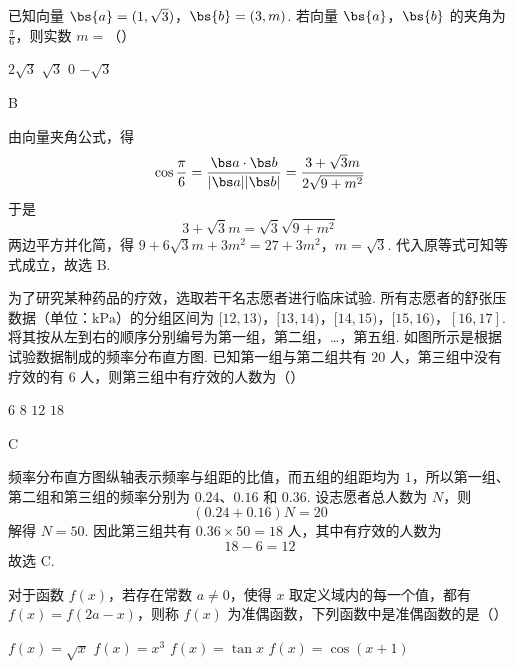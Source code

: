 \begin{problem}
已知向量 \(\bs{a} = (1, \sqrt{3})\)，\(\bs{b} = (3, m)\). 若向量 \(\bs{a}\)，\(\bs{b}\) 的夹角为 \(\frac{\pi}{6}\)，则实数 \(m =\)（\quad）

\choices
    {\(2\sqrt{3}\)}
    {\(\sqrt{3}\)}
    {\(0\)}
    {\(-\sqrt{3}\)}
\end{problem}

\begin{answer}
B
\end{answer}

\begin{solution}
由向量夹角公式，得
\[
\cos\frac\pi6=\frac{\bs a\cdot\bs b}{|\bs a||\bs b|}
 =\frac{3+\sqrt3m}{2\sqrt{9+m^2}}
\]
于是
\[
3+\sqrt3m=\sqrt3\sqrt{9+m^2}
\]
两边平方并化简，得
\(9+6\sqrt3m+3m^2=27+3m^2\)，\(m=\sqrt3\).
代入原等式可知等式成立，故选 B.
\end{solution}

\begin{problem}
为了研究某种药品的疗效，选取若干名志愿者进行临床试验. 所有志愿者的舒张压数据（单位：\(\mathrm{kPa}\)）的分组区间为 \([12,13)\)，\([13,14)\)，\([14,15)\)，\([15,16)\)，\([16,17]\). 将其按从左到右的顺序分别编号为第一组，第二组，…，第五组. 如图所示是根据试验数据制成的频率分布直方图. 已知第一组与第二组共有 \(20\text{ 人}\)，第三组中没有疗效的有 \(6\text{ 人}\)，则第三组中有疗效的人数为（\quad）


\choices
    {\(6\)}
    {\(8\)}
    {\(12\)}
    {\(18\)}
\end{problem}

\begin{answer}
C
\end{answer}

\begin{solution}
频率分布直方图纵轴表示频率与组距的比值，而五组的组距均为 \(1\)，所以第一组、第二组和第三组的频率分别为 \(0.24\)、\(0.16\) 和 \(0.36\). 设志愿者总人数为 \(N\)，则
\[
(0.24+0.16)N=20
\]
解得 \(N=50\). 因此第三组共有 \(0.36\times50=18\) 人，其中有疗效的人数为
\[
18-6=12
\]
故选 C.
\end{solution}

\begin{problem}
对于函数 \( f(x) \)，若存在常数 \( a \neq 0 \)，使得 \( x \) 取定义域内的每一个值，都有 \( f(x) = f(2a - x) \)，则称 \( f(x) \) 为准偶函数，下列函数中是准偶函数的是（\quad）

\choices
    {\(f(x) = \sqrt{x}\)}
    {\(f(x) = x^{3}\)}
    {\(f(x) = \tan x\)}
    {\(f(x) = \cos (x + 1)\)}
\end{problem}

